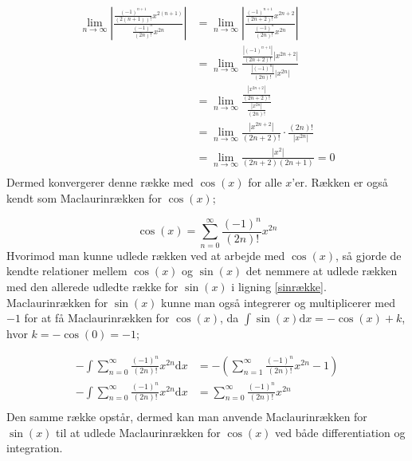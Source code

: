 \begin{align*}
\lim\limits_{n \to \infty}
\left\lvert
\frac{\frac{(-1)^{n+1}}{(2(n+1))!}x^{2(n+1)}}
{\frac{(-1)^n}{(2n)!}x^{2n}} 
\right\lvert
&=
\lim\limits_{n \to \infty}
\left\lvert
\frac{\frac{(-1)^{n+1}}{(2n+2)!}x^{2n+2}}
{\frac{(-1)^n}{(2n)!}x^{2n}}
\right\lvert 
\\
&=
\lim\limits_{n \to \infty}
\frac{\frac{\left\lvert (-1)^{n+1} \right\lvert }{(2n+2)!} \left\lvert x^{2n+2} \right\lvert }
{\frac{\left\lvert (-1)^n \right\lvert }{(2n)!} \left\lvert x^{2n} \right\lvert }
\\
&=
\lim\limits_{n \to \infty}
\frac{\frac{\left\lvert x^{2n+2} \right\lvert}{(2n+2)!}}
{\frac{\left\lvert x^{2n} \right\lvert}{(2n)!} }
\\
&=
\lim\limits_{n \to \infty}
\frac{\left\lvert x^{2n+2} \right\lvert}{(2n+2)!}
\cdot
\frac{(2n)!}{\left\lvert x^{2n} \right\lvert}
\\
&=
\lim\limits_{n \to \infty}
\frac{\left\lvert x^{2} \right\lvert}{(2n+2)(2n+1)}
=0 \\
\end{align*}
Dermed konvergerer denne række med $\cos(x)$ for alle $x$'er. Rækken er også kendt som Maclaurinrækken for $\cos(x)$;


\begin{equation}\label{cosrække}
\cos(x)=\sum_{n=0}^{\infty} \frac{(-1)^n}{(2n)!}x^{2n}
\end{equation}
Hvorimod man kunne udlede rækken ved at arbejde med $\cos(x)$, så gjorde de kendte relationer mellem $\cos(x)$ og $\sin(x)$ det nemmere at udlede rækken med den allerede udledte række for $\sin(x)$ i ligning \ref{sinrække}. Maclaurinrækken  for $\sin(x)$ kunne man også integrerer og multiplicerer med $-1$ for at få Maclaurinrækken for $\cos(x)$, da $\int \sin(x) \mathrm{d} x=-\cos(x)+k$, hvor $k=-\cos(0)=-1$;

\begin{align*}
-\int \sum_{n=0}^{\infty} \frac{(-1)^n}{(2n)!}x^{2n} \mathrm{d} x
&=
-\left(\sum_{n=1}^{\infty} \frac{(-1)^n}{(2n)!}x^{2n}-1\right) \\
-\int \sum_{n=0}^{\infty} \frac{(-1)^n}{(2n)!}x^{2n} \mathrm{d} x
&=
\sum_{n=0}^{\infty} \frac{(-1)^n}{(2n)!}x^{2n} \\
\end{align*}
Den samme række opstår, dermed kan man anvende Maclaurinrækken for $\sin(x)$ til at udlede Maclaurinrækken for $\cos(x)$ ved både differentiation og integration.

